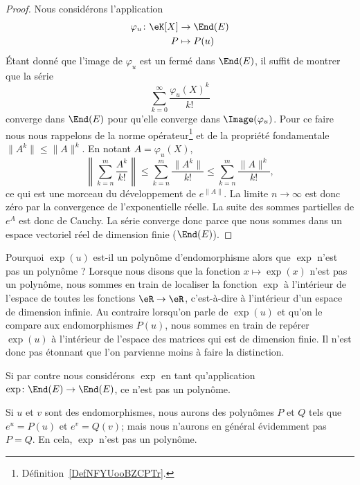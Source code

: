 \begin{proof}
	Nous considérons l'application
	\begin{equation}
		\begin{aligned}
			\varphi_u\colon \eK[X] & \to \End(E)  \\
			P                      & \mapsto P(u)
		\end{aligned}
	\end{equation}
	Étant donné que l'image de \( \varphi_u\) est un fermé dans \( \End(E)\), il suffit de montrer que la série
	\begin{equation}
		\sum_{k=0}^{\infty}\frac{ \varphi_u(X)^k }{ k! }
	\end{equation}
	converge dans \( \End(E)\) pour qu'elle converge dans \( \Image(\varphi_u)\). Pour ce faire nous nous rappelons de la norme opérateur\footnote{Définition~\ref{DefNFYUooBZCPTr}.} et de la propriété fondamentale \( \| A^k \|\leq \| A \|^k\). En notant \( A=\varphi_u(X)\),
	\begin{equation}
		\left\| \sum_{k=n}^m\frac{ A^k }{ k! } \right\|\leq \sum_{k=n}^m\frac{ \| A^k \| }{ k! }\leq \sum_{k=n}^m\frac{ \| A \|^k }{ k! },
	\end{equation}
	ce qui est une morceau du développement de \(  e^{\| A \|}\). La limite \( n\to\infty\) est donc zéro par la convergence de l'exponentielle réelle. La suite des sommes partielles de  \( e^{A}\) est donc de Cauchy. La série converge donc parce que nous sommes dans un espace vectoriel réel de dimension finie (\( \End(E)\)).
\end{proof}

\begin{normaltext}
	Pourquoi \( \exp(u)\) est-il un polynôme d'endomorphisme alors que \( \exp\) n'est pas un polynôme ? Lorsque nous disons que la fonction \( x\mapsto \exp(x)\) n'est pas un polynôme, nous sommes en train de localiser la fonction \( \exp\) à l'intérieur de l'espace de toutes les fonctions \( \eR\to \eR\), c'est-à-dire à l'intérieur d'un espace de dimension infinie. Au contraire lorsqu'on parle de \( \exp(u)\) et qu'on le compare aux endomorphismes \( P(u)\), nous sommes en train de repérer \( \exp(u)\) à l'intérieur de l'espace des matrices qui est de dimension finie. Il n'est donc pas étonnant que l'on parvienne moins à faire la distinction.

	Si par contre nous considérons \( \exp\) en tant qu'application \( \exp\colon \End(E)\to \End(E)\), ce n'est pas un polynôme.

	Si \( u\) et \( v\) sont des endomorphismes, nous aurons des polynômes \( P\) et \( Q\) tels que \( e^u=P(u)\) et \( e^v=Q(v)\); mais nous n'aurons en général évidemment pas \( P=Q\). En cela, \( \exp\) n'est pas un polynôme.
\end{normaltext}

